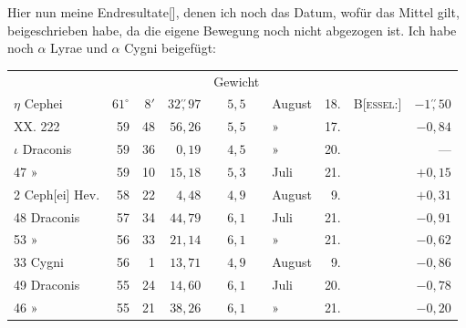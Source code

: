 \noindent\hspace*{\parindent}Hier nun meine Endresultate[\begingroup\renewcommand{\thefootnote}{*)}\footnotemark[\value{footnote}]\endgroup], denen ich noch das Datum, wofür das Mittel gilt, beigeschrieben habe, da die eigene Bewegung noch nicht abgezogen ist. Ich habe noch \(\alpha\) Lyrae und \(\alpha\) Cygni beigefügt:
\begin{center}\begingroup\fontsize{9.5}{12}\selectfont\setlength{\tabcolsep}{2pt}
\begin{tabular}{@{}lrrrclrlr@{}}
&&&&Gewicht&&&&\\
\(\eta\) Cephei&\(61^\circ\)&\(8'\)&\(32\overset{\prime\prime}{,}97\)&\(5{,}5\)&August&18.&B[\textsc{essel}:]&\(-1\overset{\prime\prime}{,}50\)\\
XX. 222&59&48&\(56{,}26\)&\(5{,}5\)&»&17.&&\(-0{,}84\)\\
\(\iota\) Draconis&59&36&\(0{,}19\)&\(4{,}5\)&»&20.&&—\\
47 »&59&10&\(15{,}18\)&\(5{,}3\)&Juli&21.&&\(+0{,}15\)\\
2 Ceph[ei] Hev.&58&22&\(4{,}48\)&\(4{,}9\)&August&9.&&\(+0{,}31\)\\
48 Draconis&57&34&\(44{,}79\)&\(6{,}1\)&Juli&21.&&\(-0{,}91\)\\
53 »&56&33&\(21{,}14\)&\(6{,}1\)&»&21.&&\(-0{,}62\)\\
33 Cygni&56&1&\(13{,}71\)&\(4{,}9\)&August&9.&&\(-0{,}86\)\\
49 Draconis&55&24&\(14{,}60\)&\(6{,}1\)&Juli&20.&&\(-0{,}78\)\\
46 »&55&21&\(38{,}26\)&\(6{,}1\)&»&21.&&\(-0{,}20\)
\end{tabular}\par\endgroup\end{center}
\clearpage{}\HistoricalFoot{}{42\textsuperscript{*}}
